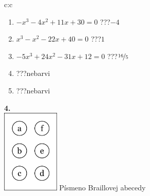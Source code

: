 \documentclass[10pt]{report}
\begin{document}
\begin{tabular}{c:c}
\begin{minipage}[c][104.5mm][t]{0.5\linewidth}
\begin{center}
\begin{minipage}{0.79\linewidth}
\begin{center}
\begin{varwidth}{\linewidth}
\begin{enumerate}
\item $-x^3-4x^2+11x+30=0$\quad \dotfill\; ???\;\dotfill \quad $-4$
\item $x^3-x^2-22x+40=0$\quad \dotfill\; ???\;\dotfill \quad $1$
\item $-5x^3+24x^2-31x+12=0$\quad \dotfill\; ???\;\dotfill \quad $\nicefrac{16}{5}$
\item \quad \dotfill\; ???\;\dotfill \quad nebarvi
\item \quad \dotfill\; ???\;\dotfill \quad nebarvi
\end{enumerate}
\end{varwidth}
\end{center}
\end{minipage}
\begin{minipage}{0.20\linewidth}
\begin{center}
{\Huge\bfseries 4.} \\[2mm]
\includegraphics[height=40mm]{../images/braille.png}
{\small Písmeno Braillovej abecedy}
\end{center}
\end{minipage}
\end{center}
\end{minipage}
%
\end{tabular}
\newpage
\thispagestyle{empty}
\end{document}
